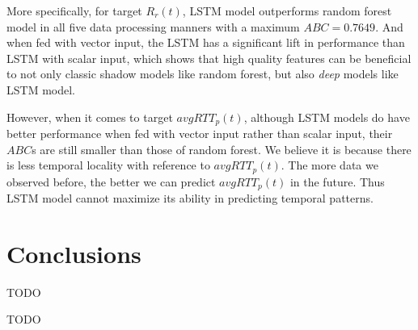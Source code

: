 \documentclass[sigconf]{acmart}
\begin{document}
	More specifically, for target $R_r(t)$, LSTM model outperforms random forest model in all five data processing manners with a maximum $ABC=0.7649$. And when fed with vector input, the LSTM has a significant lift in performance than LSTM with scalar input, which shows that high quality features can be beneficial to not only classic shadow models like random forest, but also \textit{deep} models like LSTM model.
	
	However, when it comes to target $avgRTT_p(t)$, although LSTM models do have better performance when fed with vector input rather than scalar input, their $ABC$s are still smaller than those of random forest. We believe it is because there is less temporal locality with reference to $avgRTT_p(t)$. The more data we observed before, the better we can predict $avgRTT_p(t)$ in the future. Thus LSTM model cannot maximize its ability in predicting temporal patterns.
	\section{Conclusions}
	TODO
	

	
	\begin{acks}
		TODO
	\end{acks}
	
	
	 	
	
	
	
\end{document}
